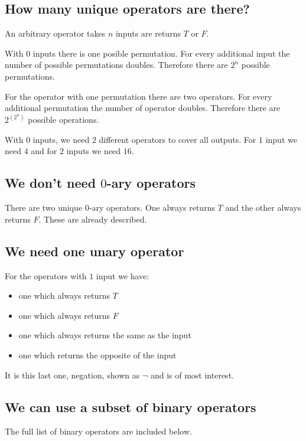\subsection{How many unique operators are there?}

An arbitrary operator takes \(n\) inputs are returns \(T\) or \(F\).

With \(0\) inputs there is one posible permutation. For every additional input the number of possible permutations doubles. Therefore there are \(2^n\) possible permutations.

For the operator with one permutation there are two operators. For every additional permutation the number of operator doubles. Therefore there are \(2^{(2^n)}\) possible operations.

With \(0\) inputs, we need \(2\) different operators to cover all outputs. For \(1\) input we need \(4\) and for \(2\) inputs we need \(16\).

\subsection{We don't need \(0\)-ary operators}

There are two unique \(0\)-ary operators. One always returns \(T\) and the other always returns \(F\). These are already described.

\subsection{We need one unary operator}

For the operators with \(1\) input we have:

\begin{itemize}
\item one which always returns \(T\)
\item one which always returns \(F\)
\item one which always returns the same as the input
\item one which returns the opposite of the input
\end{itemize}

It is this last one, negation, shown as \(\neg \) and is of most interest.

\subsection{We can use a subset of binary operators}

The full list of binary operators are included below.

